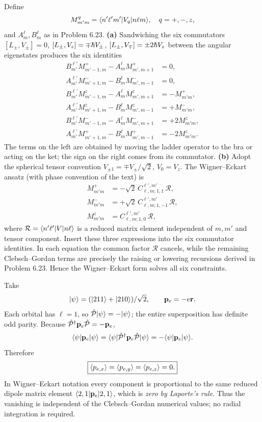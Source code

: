 Define
\[
M^{q}_{m'm}=\langle n'\ell'm'\rvert V_q\lvert n\ell m\rangle,
\quad q=+,-,z,
\]
and $A_m^\ell,B_m^\ell$
as in Problem 6.23.
\textbf{(a)} Sandwiching the six
commutators $[L_\pm,V_\pm]=0$,
$[L_\pm,V_z]=\mp\hbar V_\pm$,
$[L_\pm,V_\mp]=\pm2\hbar V_z$
between the angular eigenstates
produces the six identities
\begin{align}
B_{m'}^{\ell'}M^+_{m'-1,m}
-A_m^\ell M^+_{m',m+1}&=0,\\
A_{m'}^{\ell'}M^-_{m'+1,m}
-B_m^\ell M^-_{m',m-1}&=0,\\
B_{m'}^{\ell'}M^z_{m'-1,m}
-A_m^\ell M^z_{m',m+1}&=-M^+_{m'm},\\
A_{m'}^{\ell'}M^z_{m'+1,m}
-B_m^\ell M^z_{m',m-1}&=+M^-_{m'm},\\
B_{m'}^{\ell'}M^-_{m'-1,m}
-A_m^\ell M^-_{m',m+1}&=+2M^z_{m'm},\\
A_{m'}^{\ell'}M^+_{m'+1,m}
-B_m^\ell M^+_{m',m-1}&=-2M^z_{m'm}.
\end{align}
The terms on the left are obtained by
moving the ladder operator to the bra
or acting on the ket; the sign on the
right comes from its commutator.
\textbf{(b)} Adopt the spherical tensor
convention $V_{\pm1}=\mp V_\pm/\sqrt2$,
$V_0=V_z$. The Wigner--Eckart
ansatz (with phase convention of the text) is
\begin{equation}
\boxed{\begin{aligned}
M^+_{m'm}&=-\sqrt2\,
C^{\ell',m'}_{\ell,m;1,1}\,\mathcal R,\\
M^-_{m'm}&=+\sqrt2\,
C^{\ell',m'}_{\ell,m;1,-1}\,\mathcal R,\\
M^z_{m'm}&=
C^{\ell',m'}_{\ell,m;1,0}\,\mathcal R,
\end{aligned}}
\end{equation}
where $\mathcal R=\langle n'\ell'\rvert V\lvert n\ell\rangle$
is a reduced matrix element independent of
$m,m'$ and tensor component.
Insert these three expressions into
the six commutator identities.
In each equation the common factor
$\mathcal R$ cancels, while the remaining
Clebsch--Gordan terms are precisely
the raising or lowering recursions
derived in Problem 6.23.
Hence the Wigner--Eckart form
solves all six constraints.

Take
\[
\lvert \psi\rangle=(\lvert 211\rangle+\lvert 210\rangle)/\sqrt2,\qquad
\mathbf p_e=-e\mathbf r.
\]
Each orbital has $\ell=1$, so
$\hat{\mathcal P}\lvert \psi\rangle=-\lvert \psi\rangle$;
the entire superposition has definite
odd parity. Because
$\hat{\mathcal P}^\dagger\mathbf p_e\hat{\mathcal P}=-\mathbf p_e$,
\[
\langle \psi\rvert\mathbf p_e\lvert \psi\rangle
=\langle \psi\rvert\hat{\mathcal P}^\dagger\mathbf p_e\hat{\mathcal P}\lvert \psi\rangle
=-\langle \psi\rvert\mathbf p_e\lvert \psi\rangle.
\]
Therefore
\begin{equation}
\boxed{\langle p_{e,x}\rangle=\langle p_{e,y}\rangle=
\langle p_{e,z}\rangle=0.}
\end{equation}
In Wigner--Eckart notation every
component is proportional to
the same reduced dipole matrix element
$\langle 2,1\rvert\mathbf p_e\lvert 2,1\rangle$,
which is \emph{zero by Laporte's rule}.
Thus the vanishing is independent
of the Clebsch--Gordan numerical values;
no radial integration is required.
